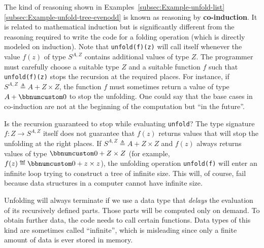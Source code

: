 The kind of reasoning shown in Examples~\ref{subsec:Example-unfold-list}\textendash \ref{subsec:Example-unfold-tree-evenodd}
is known as reasoning by \textbf{co-induction}.
It is related to mathematical induction but is significantly different
from the reasoning required to write the code for a folding operation
(which is directly modeled on induction). Note that \lstinline!unfold(f)(z)!
will call itself whenever the value $f(z)$ of type $S^{A,Z}$ contains
additional values of type $Z$. The programmer must carefully choose
a suitable type $Z$ and a suitable function $f$ such that \lstinline!unfold(f)(z)!
stops the recursion at the required places. For instance, if $S^{A,Z}\triangleq A+Z\times Z$,
the function $f$ must sometimes return a value of type $A+\bbnum 0$
to stop the unfolding. One could say that the base cases in co-induction
are not at the beginning of the computation but \textsf{``}in the future\textsf{''}. 

Is the recursion guaranteed to stop while evaluating \lstinline!unfold!?
The type signature $f:Z\rightarrow S^{A,Z}$ itself does not guarantee
that $f(z)$ returns values that will stop the unfolding at the right
places. If $S^{A,Z}\triangleq A+Z\times Z$ and $f(z)$ always returns
values of type $\bbnum 0+Z\times Z$ (for example, $f(z)\triangleq\bbnum 0+z\times z$),
the unfolding operation \lstinline!unfold(f)! will enter an infinite
loop trying to construct a tree of infinite size. This will, of course,
fail because data structures in a computer cannot have infinite size.

Unfolding will always terminate if we use a data type that \emph{delays}
the evaluation of its recursively defined parts. Those parts will
be computed only on demand. To obtain further data, the code needs
to call certain functions. Data types of this kind are sometimes called
\textsf{``}infinite\textsf{''}, which is misleading since
only a finite amount of data is ever stored in memory.

